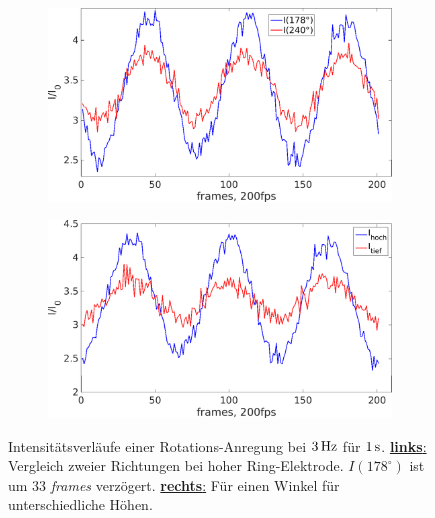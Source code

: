 \documentclass[numbers=noenddot,a4paper,notitlepage,twoside,BCOR15mm]{scrbook}
\newcommand{\degree}{^\circ}
\newcommand{\tilt}[1]{\textit{#1}}
\newcommand{\fett}[1]{\textbf{#1}}
\begin{document}
						\begin{figure}[!t]
							\centering
							\begin{subfigure}{0.49\textwidth}
								\centering
								\includegraphics[width=\textwidth,height=0.65\textwidth]{figs/auswertung/plasmaglw/intensrotathoch178u2402Hz1sek.png}
							\end{subfigure}
							\begin{subfigure}{0.49\textwidth}
								\centering
								\includegraphics[width=\textwidth,height=0.65\textwidth]{figs/auswertung/plasmaglw/intensrotathochutief1783Hz1sek.png}
							\end{subfigure}
							\caption{Intensitätsverläufe einer Rotations-Anregung bei $\unit[3]{Hz}$ für $\unit[1]{s}$. \underline{\fett{links}:} Vergleich zweier Richtungen bei hoher Ring-Elektrode. $I\left(178\degree\right)$ ist um 33 \tilt{frames} verzögert. \underline{\fett{rechts}:} Für einen Winkel für unterschiedliche Höhen.}\label{img:intensrotathochutief}
						\end{figure}
\end{document}
